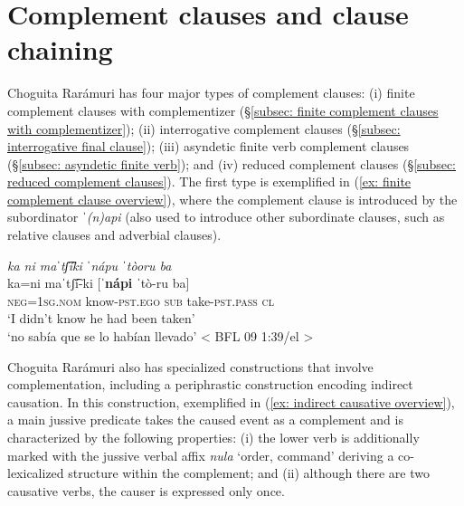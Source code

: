 \section{Complement clauses and clause chaining}
\label{sec: complement clauses and clause chaining}

Choguita Rarámuri has four major types of complement clauses: (i) finite complement clauses with complementizer (§\ref{subsec: finite complement clauses with complementizer}); (ii) interrogative complement clauses (§\ref{subsec: interrogative final clause}); (iii) asyndetic finite verb complement clauses (§\ref{subsec: asyndetic finite verb}); and (iv) reduced complement clauses (§\ref{subsec: reduced complement clauses}). The first type is exemplified in (\ref{ex: finite complement clause overview}), where the complement clause is introduced by the subordinator \textit{ˈ(n)api} (also used to introduce other subordinate clauses, such as relative clauses and adverbial clauses).

\ea\label{ex: finite complement clause overview}

    \textit{ka ni maˈtʃ͡íki ˈnápu ˈtòoru ba}\\
    \gll    ka=ni maˈtʃ͡í-ki [\textbf{ˈnápi}  ˈtò-ru ba]\\
            \textsc{neg=1sg.nom}  know-\textsc{pst.ego} \textsc{sub} take-\textsc{pst.pass} \textsc{cl}\\
    \glt    `I didn’t know he had been taken’\\
    \glt    `no sabía que se lo habían llevado’ < BFL 09 1:39/el >\\

\z

Choguita Rarámuri also has specialized constructions that involve complementation, including a periphrastic construction encoding indirect causation. In this construction, exemplified in (\ref{ex: indirect causative overview}), a main jussive predicate takes the caused event as a complement and is characterized by the following properties: (i) the lower verb is additionally marked with the jussive verbal affix \textit{nula} ‘order, command’ deriving a co-lexicalized structure within the complement; and (ii) although there are two causative verbs, the causer is expressed only once.

\ea\label{ex: indirect causative overview}

